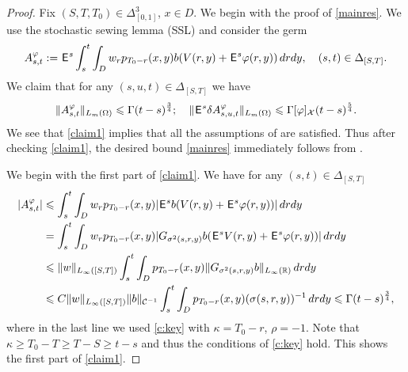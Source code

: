 \documentclass[12pt]{article}
\theoremstyle{definition}
\DeclareMathOperator{\1}{\mathbbm{1}}%
\def\E{\hskip.15ex\mathsf{E}\hskip.10ex}
\def\phi{\varphi}
\renewcommand{\ge}{\geqslant}
\renewcommand{\le}{\leqslant}
\newcommand{\C}{\mathcal{C}}
\newcommand{\R}{\mathbb{R}}
\newcommand{\X}{\mathcal{X}}
\begin{document}
\begin{proof}
	Fix $(S,T,T_0)\in\Delta_{[0,1]}^3$, $x\in D$. 
We begin with the proof of \eqref{mainres}. 
We use the stochastic sewing lemma (SSL) \cite[Theorem~2.1]{LeSSL} and consider the germ 
\begin{equation}\label{aagerm}
A_{s,t}^\phi:=\E^s\int_s^t \int_D w_r p_{T_0-r}(x,y) b( V(r,y)+\E^s
\phi(r,y))\,dr dy,\quad (s,t)\in\Delta_{[S,T]}.
\end{equation}
We claim that for any $(s,u,t)\in\Delta_{[S,T]}$ we have 
\begin{equation}\label{claim1}
\|A_{s,t}^\phi\|_{L_m(\Omega)}\le \Gamma (t-s)^{\frac34};\quad
\|\E^s\delta A^\phi_{s,u,t}\|_{L_m(\Omega)}\le  \Gamma [\phi]_{\X}(t-s)^{\frac54}.
\end{equation}
We see that \eqref{claim1} implies that all the assumptions of \cite[Theorem~2.1]{LeSSL}  are satisfied.  Thus after checking  \eqref{claim1},  the desired bound \eqref{mainres} immediately follows from \cite[Theorem~2.1]{LeSSL}. 

We begin with the first part of \eqref{claim1}. We have for any $(s,t)\in\Delta_{[S,T]}$
\begin{align*}
|A_{s,t}^\phi|&\le \int_s^t \int_D w_r  p_{T_0-r}(x,y) |\E^s b( V(r,y)+\E^s \phi(r,y))|\,dr dy\\
&= \int_s^t \int_D w_r p_{T_0-r}(x,y) |G_{\sigma^2(s,r,y)} b(\E^s V(r,y)+\E^s\phi(r,y))|\,dr dy\\
&\le \|w\|_{L_\infty([S,T])} \int_s^t \int_D    p_{T_0-r}(x,y) \|G_{\sigma^2(s,r,y)} b\|_{L_\infty(\R)}\,dr dy\\
&\le C\|w\|_{L_\infty([S,T])}  \|b\|_{\C^{-1}}\int_s^t \int_D p_{T_0-r}(x,y) (\sigma(s,r,y))^{-1}\,dr dy\le \Gamma (t-s)^{\frac34}, 
\end{align*}
 where in the last line we used \cref{c:key} with $ \kappa=T_0-r$, $\rho=-1$. Note that $\kappa\ge  T_0-T\ge T-S\ge t-s$ and thus the conditions of \cref{c:key} hold. This shows the first part of  \eqref{claim1}. 
 

\end{proof}
\end{document}
